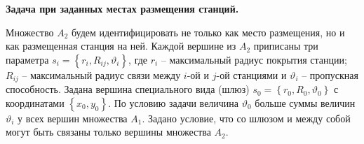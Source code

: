 


\textbf{Задача при заданных местах размещения станций.}






Множество $A_2$ будем идентифицировать не только как место размещения, но и как размещенная станция на ней. Каждой вершине из $A_2$ приписаны три параметра $s_i = \left\{ r_i, R_{ij},\vartheta_i \right\}$, где $r_i$ -- максимальный радиус покрытия станции; $R_{ij}$ -- максимальный радиус связи между $i$-ой и $j$-ой станциями и $\vartheta_i$ -- пропускная способность. Задана вершина специального вида (шлюз) $s_0 = \left\{ r_0, R_0, \vartheta_0 \right\} $ с координатами $\left\{x_0, y_0 \right\}$. По условию задачи величина $\vartheta_0$ больше суммы величин $\vartheta_i$ у всех вершин множества $A_1$. Задано условие, что со шлюзом и между собой могут быть связаны только вершины множества $A_2$.

